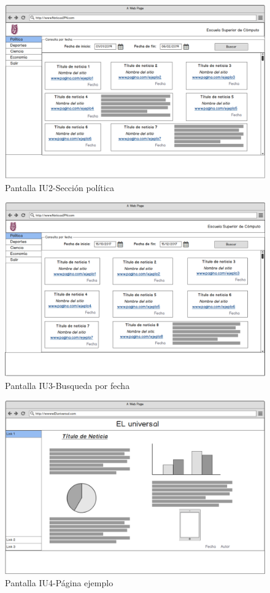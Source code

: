 \begin{figure}[h]
  \centering 
	\includegraphics[scale=.35]{imagenes/Pantallas/UI2}
  \caption{Pantalla IU2-Sección política}
  \label{fig:IU2}
\end{figure}

\begin{figure}[h]
  \centering
	\includegraphics[scale=.35]{imagenes/Pantallas/UI3}
  \caption{Pantalla IU3-Busqueda por fecha}
  \label{fig:IU3}
\end{figure}


\begin{figure}[h]
  \centering
	\includegraphics[scale=.35]{imagenes/Pantallas/UI4}
  \caption{Pantalla IU4-Página ejemplo}
  \label{fig:IU4}
\end{figure}